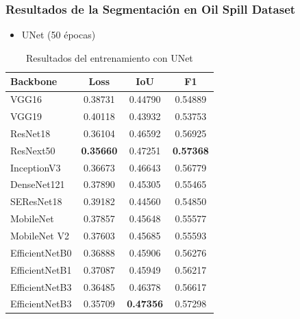 \begin{frame}
\frametitle{Resultados de la Segmentación en Oil Spill Dataset}

\begin{itemize}
    \item UNet (50 épocas)
\end{itemize}    
    \begin{table}[]
        \centering
        \small
        \begin{tabular}{l|c|c|c}
            \hline
            Backbone        & Loss    & IoU     & F1 \\
            \hline
            VGG16           & 0.38731 & 0.44790 & 0.54889 \\
            VGG19           & 0.40118 & 0.43932 & 0.53753 \\
            ResNet18        & 0.36104 & 0.46592 & 0.56925 \\
            ResNext50       & \textbf{0.35660} & 0.47251 & \textbf{0.57368} \\ 
            InceptionV3     & 0.36673 & 0.46643 & 0.56779 \\
            DenseNet121     & 0.37890 & 0.45305 & 0.55465 \\
            SEResNet18      & 0.39182 & 0.44560 & 0.54850 \\
            MobileNet       & 0.37857 & 0.45648 & 0.55577 \\ 
            MobileNet V2    & 0.37603 & 0.45685 & 0.55593 \\
            EfficientNetB0  & 0.36888 & 0.45906 & 0.56276 \\
            EfficientNetB1  & 0.37087 & 0.45949 & 0.56217 \\
            EfficientNetB3  & 0.36485 & 0.46378 & 0.56617 \\
            EfficientNetB3  & 0.35709 & \textbf{0.47356} & 0.57298 \\
            \hline
        \end{tabular}
        \caption{Resultados del entrenamiento con UNet}
        \label{tab:my_label}
    \end{table}

\end{frame}

